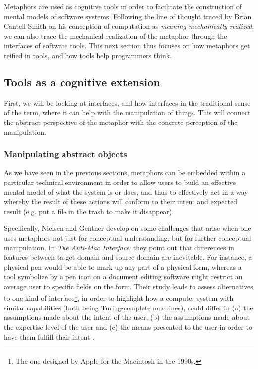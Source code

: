 \spacer

Metaphors are used as cognitive tools in order to facilitate the construction of mental models of software systems. Following the line of thought traced by Brian Cantell-Smith on his conception of computation as \emph{meaning mechanically realized}, we can also trace the mechanical realization of the metaphor through the interfaces of software tools. This next section thus focuses on how metaphors get reified in tools, and how tools help programmers think.

\subsection{Tools as a cognitive extension} %

First, we will be looking at interfaces, and how interfaces in the traditional sense of the term, where it can help with the manipulation of things. This will connect the abstract perspective of the metaphor with the concrete perception of the manipulation.

\subsubsection{Manipulating abstract objects}

As we have seen in the previous sections, metaphors can be embedded within a  particular technical environment in order to allow users to build an effective mental model of what the system is or does, and thus to effectively act in  a way whereby the result of these actions will conform to their intent and expected result (e.g. put a file in the trash to make it disappear).

Specifically, Nielsen and Gentner develop on some challenges that arise when one uses metaphors not just for conceptual understanding, but for further conceptual manipulation. In \emph{The Anti-Mac Interface}, they point out that differences in features between target domain and source domain are inevitable. For instance, a physical pen would be able to mark up any part of a physical form, whereas a tool symbolize by a pen icon on a document editing software might restrict an average user to specific fields on the form. Their study leads to assess alternatives to one kind of interface\footnote{The one designed by Apple for the Macintosh in the 1990s.}, in order to highlight how a computer system with similar capabilities (both being Turing-complete machines), could differ in (a) the assumptions made about the intent of the user, (b) the assumptions made about the expertise level of the user and (c) the means presented to the user in order to have them fulfill their intent \citep{gentner_antimac_1996}.

